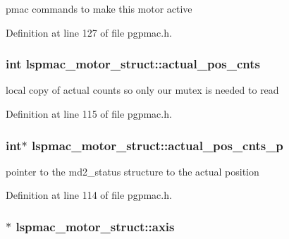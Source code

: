 pmac commands to make this motor active 



Definition at line 127 of file pgpmac.\-h.

\hypertarget{structlspmac__motor__struct_ae5c7aea45b9637a1817be246688fd980}{
\subsubsection[{actual\-\_\-pos\-\_\-cnts}]{\setlength{\rightskip}{0pt plus 5cm}int lspmac\-\_\-motor\-\_\-struct\-::actual\-\_\-pos\-\_\-cnts}}\label{structlspmac__motor__struct_ae5c7aea45b9637a1817be246688fd980}


local copy of actual counts so only our mutex is needed to read 



Definition at line 115 of file pgpmac.\-h.

\hypertarget{structlspmac__motor__struct_a312047bb71def5cd2443fecd875eaea5}{
\subsubsection[{actual\-\_\-pos\-\_\-cnts\-\_\-p}]{\setlength{\rightskip}{0pt plus 5cm}int$\ast$ lspmac\-\_\-motor\-\_\-struct\-::actual\-\_\-pos\-\_\-cnts\-\_\-p}}\label{structlspmac__motor__struct_a312047bb71def5cd2443fecd875eaea5}


pointer to the md2\-\_\-status structure to the actual position 



Definition at line 114 of file pgpmac.\-h.

\hypertarget{structlspmac__motor__struct_a7437ef16c2dce65bde4dda1ea00e9df3}{
\subsubsection[{axis}]{$\ast$ lspmac\-\_\-motor\-\_\-struct\-::axis}}\label{structlspmac__motor__struct_a7437ef16c2dce65bde4dda1ea00e9df3}


